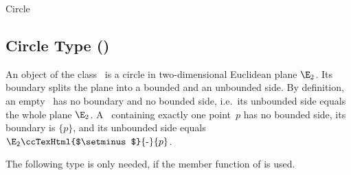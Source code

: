 
\ccAutoIndexingOff
\ccHtmlNoClassToc
\ccHtmlNoClassLinks
\ccHtmlNoClassIndex
\begin{ccClass}{Circle}
\subsection*{Circle Type (\ccClassTemplateName)}

\ccSaveThreeColumns
{}
\ccPropagateThreeToTwoColumns

\ccDefinition
 
An object of the class \ccClassName\ is a circle in two-dimensional
Euclidean plane $\E_2$. Its boundary splits the plane into a bounded
and an unbounded side. By definition, an empty \ccClassName\ has no
boundary and no bounded side, i.e.\ its unbounded side equals the
whole plane $\E_2$. A \ccClassName\ containing exactly one point~$p$
has no bounded side, its boundary is $\{p\}$, and its unbounded side
equals $\E_2\mbox{\ccTexHtml{$\setminus$}{-}}\{p\}$.

\ccTypes
 

The following type is only needed, if the member function 
of  is used.

 
\ccCreation
{}
 




\end{ccClass}
